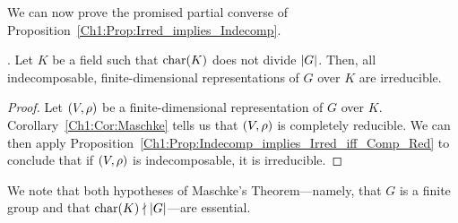 We can now prove the promised partial converse of Proposition~\ref{Ch1:Prop:Irred_implies_Indecomp}.
\begin{corollary}\label{Ch1:Cor:Indecomp_implies_Irred_of_Maschke}
    . Let $K$ be a field such that $\operatorname{char}\!\left( K \right)$ does not divide $\left\lvert G \right\rvert$. Then, all indecomposable, finite-dimensional representations of $G$ over $K$ are irreducible.
\end{corollary}
\begin{proof}
    Let $\left( V, \rho \right)$ be a finite-dimensional representation of $G$ over $K$. Corollary~\ref{Ch1:Cor:Maschke} tells us that $\left( V, \rho \right)$ is completely reducible. We can then apply Proposition~\ref{Ch1:Prop:Indecomp_implies_Irred_iff_Comp_Red} to conclude that if $\left( V, \rho \right)$ is indecomposable, it is irreducible.
\end{proof}

We note that both hypotheses of Maschke's Theorem---namely, that $G$ is a finite group and that $\operatorname{char}\!\left( K \right) \nmid \left\lvert G \right\rvert$---are essential.

